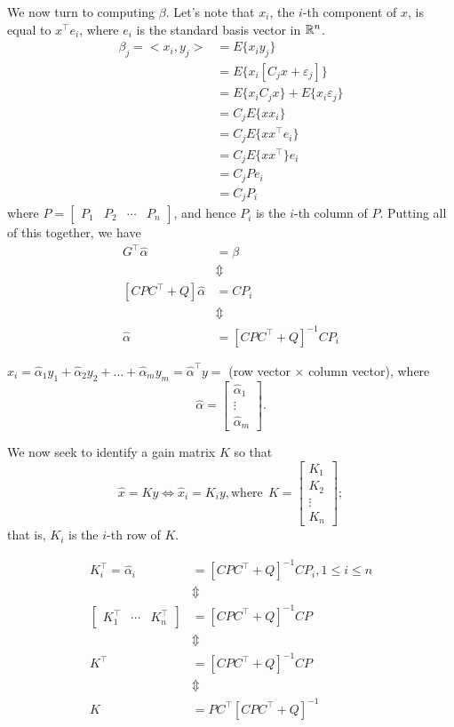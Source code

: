 We now turn to computing $\beta$. Let's note that $x_i$, the $i$-th component of $x$, is equal to $x^\top  e_i$, where $e_i$ is the standard basis vector in $\mathbb R^n$.
\begin{align*}
\beta_j = <x_i,y_j> &= E\{x_i y_j\}\\
 &= E\{x_i[C_j x+\varepsilon_j]\} \\
 &= E\{x_i C_j x\} + E\{x_i \varepsilon_j\} \\
 & = C_jE\{ x x_i\} \\
  & = C_jE\{ x x^\top  e_i\} \\
    & = C_jE\{ x x^\top  \} e_i\\
 &= C_j P e_i \\
 &= C_j P_i
\end{align*}
where $P=\begin{bmatrix} P_1 & P_2 &  \cdots & P_n \end{bmatrix}$, and hence $P_i$ is the $i$-th column of $P$. Putting all of this together, we have
\begin{align*}
G^\top \widehat \alpha &= \beta \\
&\Updownarrow \\
[CPC^\top +Q] \widehat \alpha &= C P_i \\
&\Updownarrow \\
\widehat \alpha &= [CPC^\top +Q]^{-1} C P_i
\end{align*}


$\widehat{x}_i = \widehat \alpha_1 y_1  +  \widehat \alpha_2 y_2  + \dots + \widehat \alpha_m y_m = \widehat \alpha^\top  y=$ (row vector $\times$ column vector), where
$$\widehat \alpha =   \begin{bmatrix}
    \widehat \alpha_1\\
    \vdots\\
    \widehat \alpha_m
  \end{bmatrix}.$$

We now seek to identify a gain matrix $K$ so that
$$\widehat x = Ky \iff \widehat x_i = K_i y, \text{where}~~K =    \begin{bmatrix}
   {K_1}\\
{K_2}\\
    \vdots\\
  {K_n}
  \end{bmatrix};$$
  that is, $K_i$ is the $i$-th row of $K$.

  \begin{align*}
    K_i^\top  = \widehat \alpha_i &=  [CPC^\top +Q]^{-1} C P_i, 1 \le i \le n\\
    &\Updownarrow\\
   \begin{bmatrix} K_1^\top  & \cdots & K_n^\top  \end{bmatrix} &= [CPC^\top +Q]^{-1} C P\\
   &\Updownarrow\\
   K^\top &=  [CPC^\top +Q]^{-1} C P\\
   &\Updownarrow\\
    K&=PC^\top [CPC^\top +Q]^{-1}\
\end{align*}

